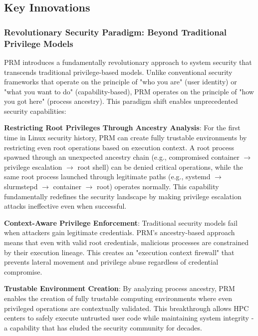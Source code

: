 \documentclass[conference]{IEEEtran}
\begin{document}
\subsection{Key Innovations}

\subsubsection{Revolutionary Security Paradigm: Beyond Traditional Privilege Models}
PRM introduces a fundamentally revolutionary approach to system security that transcends traditional privilege-based models. Unlike conventional security frameworks that operate on the principle of "who you are" (user identity) or "what you want to do" (capability-based), PRM operates on the principle of "how you got here" (process ancestry). This paradigm shift enables unprecedented security capabilities:

\textbf{Restricting Root Privileges Through Ancestry Analysis}: For the first time in Linux security history, PRM can create fully trustable environments by restricting even root operations based on execution context. A root process spawned through an unexpected ancestry chain (e.g., compromised container $\rightarrow$ privilege escalation $\rightarrow$ root shell) can be denied critical operations, while the same root process launched through legitimate paths (e.g., systemd $\rightarrow$ slurmstepd $\rightarrow$ container $\rightarrow$ root) operates normally. This capability fundamentally redefines the security landscape by making privilege escalation attacks ineffective even when successful.

\textbf{Context-Aware Privilege Enforcement}: Traditional security models fail when attackers gain legitimate credentials. PRM's ancestry-based approach means that even with valid root credentials, malicious processes are constrained by their execution lineage. This creates an "execution context firewall" that prevents lateral movement and privilege abuse regardless of credential compromise.

\textbf{Trustable Environment Creation}: By analyzing process ancestry, PRM enables the creation of fully trustable computing environments where even privileged operations are contextually validated. This breakthrough allows HPC centers to safely execute untrusted user code while maintaining system integrity - a capability that has eluded the security community for decades.
\end{document}
